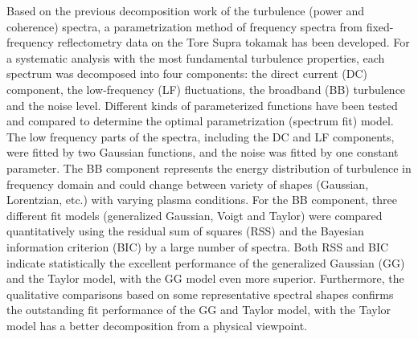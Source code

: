 Based on the previous decomposition work of the turbulence (power and coherence) spectra, a parametrization method of frequency spectra from fixed-frequency reflectometry data on the Tore Supra tokamak has been developed. For a systematic analysis with the most fundamental turbulence properties, each spectrum was decomposed into four components: the direct current (DC) component, the low-frequency (LF) fluctuations, the broadband (BB) turbulence and the noise level. Different kinds of parameterized functions have been tested and compared to determine the optimal parametrization (spectrum fit) model. The low frequency parts of the spectra, including the DC and LF components, were fitted by two Gaussian functions, and the noise was fitted by one constant parameter. The BB component represents the energy distribution of turbulence in frequency domain and could change between variety of shapes (Gaussian, Lorentzian, etc.) with varying plasma conditions. For the BB component, three different fit models (generalized Gaussian, Voigt and Taylor) were compared quantitatively using the residual sum of squares (RSS) and the Bayesian information criterion (BIC) by a large number of spectra. Both RSS and BIC indicate statistically the excellent performance of the generalized Gaussian (GG) and the Taylor model, with the GG model even more superior. Furthermore, the qualitative comparisons based on some representative spectral shapes confirms the outstanding fit performance of the GG and Taylor model, with the Taylor model has a better decomposition from a physical viewpoint. 


